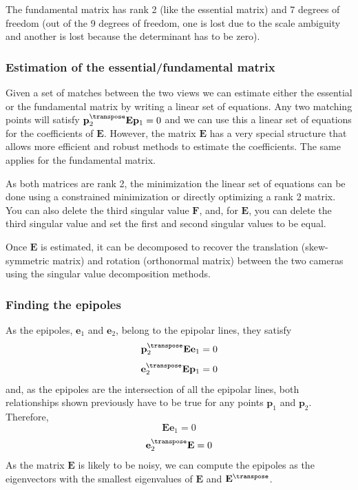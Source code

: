 The fundamental matrix has rank 2 (like the essential matrix) and 7 degrees of freedom (out of the 9 degrees of freedom, one is lost due to the scale ambiguity and another is lost because the determinant has to be zero).

\subsubsection{Estimation of the essential/fundamental matrix}
Given a set of matches between the two views we can estimate either the essential or the fundamental matrix by writing a linear set of equations. Any two matching points will satisfy $\mathbf{p}_2^\transpose \mathbf{E} \mathbf{p}_1 = 0$ and we can use this a linear set of equations for the coefficients of $\mathbf{E}$. However, the matrix $\mathbf{E}$ has a very special structure that allows more efficient and robust methods to estimate the coefficients. The same applies for the fundamental matrix.

As both matrices are rank 2, the minimization the linear set of equations can be done using a constrained minimization or directly optimizing a rank 2 matrix. You can also delete the third singular value $\mathbf{F}$, and, for $\mathbf{E}$, you can delete the third singular value and set the first and second singular values to be equal.

Once $\mathbf{E}$ is estimated, it can be decomposed to recover the translation (skew-symmetric matrix) and rotation (orthonormal matrix) between the two cameras using the singular value decomposition methods.

\subsubsection{Finding the epipoles}
As the epipoles, $\mathbf{e}_1$ and $\mathbf{e}_2$, belong to the epipolar lines, they satisfy
\begin{equation}
    \mathbf{p}_2^\transpose \mathbf{E} \mathbf{e}_1 = 0
\end{equation}\begin{equation}
    \mathbf{e}_2^\transpose \mathbf{E} \mathbf{p}_1 = 0
\end{equation}
and, as the epipoles are the intersection of all the epipolar lines, both relationships shown previously have to be true for any points $\mathbf{p}_1$ and $\mathbf{p}_2$. Therefore,
\begin{equation}
    \mathbf{E} \mathbf{e}_1 = 0
\end{equation}\begin{equation}
    \mathbf{e}_2^\transpose \mathbf{E} = 0
\end{equation}
As the matrix $\mathbf{E}$ is likely to be noisy, we can compute the epipoles as the eigenvectors with the smallest eigenvalues of $\mathbf{E}$ and $\mathbf{E}^\transpose$.



